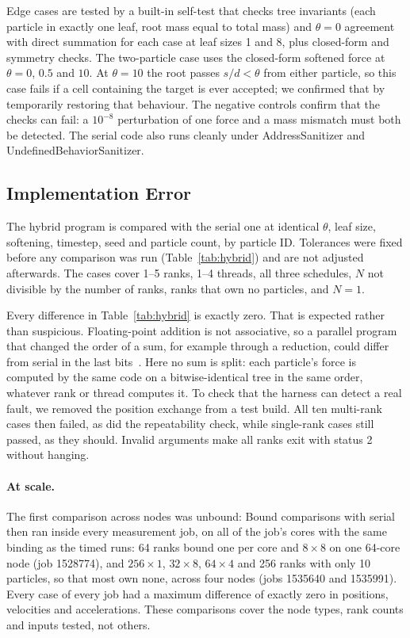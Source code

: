\documentclass[10pt,a4paper,twocolumn,twoside]{rho-class/rho}
\begin{document}


Edge cases are tested by a built-in self-test that checks tree invariants (each particle in exactly one leaf, root mass equal to total mass) and $\theta=0$ agreement with direct summation for each case at leaf sizes 1 and 8, plus closed-form and symmetry checks.  The two-particle case uses the closed-form softened force at $\theta=0$, $0.5$ and $10$. At $\theta=10$ the root passes $s/d<\theta$ from either particle, so this case fails if a cell containing the target is ever accepted; we confirmed that by temporarily restoring that behaviour. The negative controls confirm that the checks can fail: a $10^{-8}$ perturbation of one force and a mass mismatch must both be detected. The serial code also runs cleanly under AddressSanitizer and UndefinedBehaviorSanitizer.

\subsection{Implementation Error}
The hybrid program is compared with the serial one at identical $\theta$, leaf size, softening, timestep, seed and particle count, by particle ID. Tolerances were fixed before any comparison was run (Table~\ref{tab:hybrid}) and are not adjusted afterwards. The cases cover 1--5 ranks, 1--4 threads, all three schedules, $N$ not divisible by the number of ranks, ranks that own no particles, and $N=1$.



Every difference in Table~\ref{tab:hybrid} is exactly zero. That is expected rather than suspicious. Floating-point addition is not associative, so a parallel program that changed the order of a sum, for example through a reduction, could differ from serial in the last bits~\cite{Lecture8}. Here no sum is split: each particle's force is computed by the same code on a bitwise-identical tree in the same order, whatever rank or thread computes it. To check that the harness can detect a real fault, we removed the position exchange from a test build. All ten multi-rank cases then failed, as did the repeatability check, while single-rank cases still passed, as they should.  Invalid arguments make all ranks exit with status 2 without hanging.

\paragraph{At scale.} The first comparison across nodes was unbound:  Bound comparisons with serial then ran inside every measurement job, on all of the job's cores with the same binding as the timed runs: 64 ranks bound one per core and $8\times8$ on one 64-core node (job 1528774), and $256\times1$, $32\times8$, $64\times4$ and 256 ranks with only 10 particles, so that most own none, across four nodes (jobs 1535640 and 1535991). Every case of every job had a maximum difference of exactly zero in positions, velocities and accelerations. These comparisons cover the node types, rank counts and inputs tested, not others.
\end{document}
